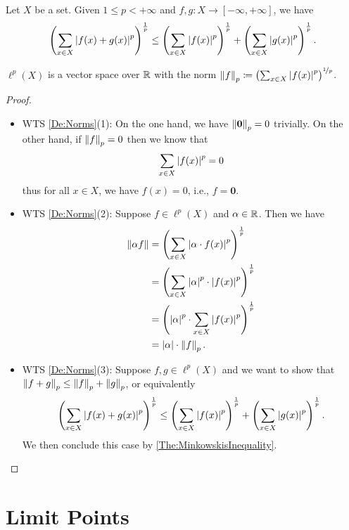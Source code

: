 \documentclass[screen,single]{techreport}
\numberwithin{equation}{section}
\begin{document}
\begin{theorem}\label{The:MinkowskisInequality}
	Let $X$ be a set.
	Given $1 \le p < +\infty$ and $f,g:X \to [-\infty,+\infty]$, we have
	\begin{equation*}
		\left({ \sum_{x \in X} \left|{f(x)+g(x)}\right|^p }\right)^{\frac{1}{p}} \le \left({ \sum_{x \in X} \left|{f(x)}\right|^p }\right)^{\frac{1}{p}} + \left({ \sum_{x \in X} \left|{g(x)}\right|^p }\right)^{\frac{1}{p}}.
	\end{equation*}
\end{theorem}

\begin{proposition}\label{Prop:lpVectorSpace}
	$\ell^p(X)$ is a vector space over $\mathbb{R}$ with the norm $\left\|{f}\right\|_p \coloneqq  \left({\sum_{x \in X} \left|{f(x)}\right|^p}\right)^{\nicefrac{1}{p}}$.
\end{proposition}
\begin{proof}\
	\begin{itemize}
		\item WTS \cref{De:Norms}(1):
		On the one hand, we have $\left\|{\mathbf{0}}\right\|_p = 0$ trivially.
		On the other hand, if $\left\|{f}\right\|_p = 0$ then we know that
		\[
		\sum_{x \in X} \left|{f(x)}\right|^p = 0
		\]
		thus for all $x \in X$, we have $f(x) = 0$, i.e., $f = \mathbf{0}$.
		
		\item WTS \cref{De:Norms}(2): Suppose $f \in \ell^p(X)$ and $\alpha \in \mathbb{R}$.
		Then we have
		\begin{align*}
			\left\|{\alpha f}\right\| & = \left({\sum_{x \in X} \left|{\alpha \cdot f(x)}\right|^p}\right)^{\frac{1}{p}} \\
			& = \left({ \sum_{x \in X} \left|{\alpha}\right|^p \cdot \left|{f(x)}\right|^p}\right)^\frac{1}{p} \\
			& = \left({ \left|{\alpha}\right|^p \cdot \sum_{x \in X} \left|{f(x)}\right|^p }\right)^\frac{1}{p} \\
			& = \left|{\alpha}\right| \cdot \left\|{f}\right\|_p.
		\end{align*}
		
		\item WTS \cref{De:Norms}(3): Suppose $f,g \in \ell^p(X)$ and we want to show that $\left\|{f+g}\right\|_p \le \left\|{f}\right\|_p+\left\|{g}\right\|_p$, or equivalently
		\[
		\left({ \sum_{x \in X} \left|{f(x) + g(x)}\right|^p }\right)^\frac{1}{p} \le \left({ \sum_{x \in X} \left|{f(x)}\right|^p}\right)^\frac{1}{p} + \left({ \sum_{x \in X} \left|{g(x)}\right|^p}\right)^\frac{1}{p}.
		\]
		We then conclude this case by \cref{The:MinkowskisInequality}.
	\end{itemize}
\end{proof}

\section{Limit Points}
\end{document}
